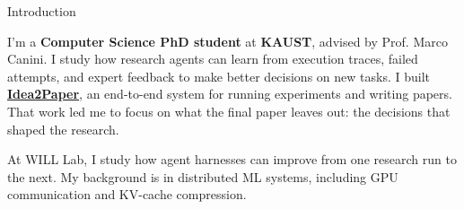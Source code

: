 
\begin{rubric}{Introduction}
\begin{minipage}{0.95\textwidth}
    I'm a \textbf{Computer Science PhD student} at \textbf{KAUST}, advised by Prof. Marco Canini. I study how research agents can learn from execution traces, failed attempts, and expert feedback to make better decisions on new tasks. I built \href{https://idea2paper.org/}{\textbf{Idea2Paper}}, an end-to-end system for running experiments and writing papers. That work led me to focus on what the final paper leaves out: the decisions that shaped the research.

    At WILL Lab, I study how agent harnesses can improve from one research run to the next. My background is in distributed ML systems, including GPU communication and KV-cache compression.
\end{minipage}
\end{rubric} 